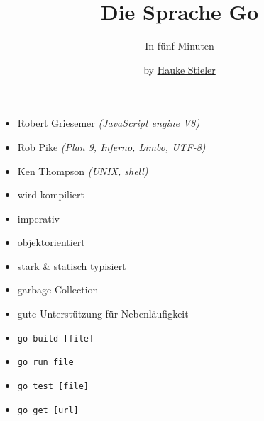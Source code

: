 \documentclass{beamer}
\title{Die Sprache Go}
\subtitle{In fünf Minuten}
\author{by \href{http://hauke-stieler.de/}{Hauke Stieler}}
\begin{document}
	\maketitle


	\begin{frame}
		\begin{itemize}
			\item Robert Griesemer {\scriptsize\textit{(JavaScript engine V8)}}
			\item Rob Pike {\scriptsize\textit{(Plan 9, Inferno, Limbo, UTF-8)}}
			\item Ken Thompson {\scriptsize\textit{(UNIX, shell)}}
		\end{itemize}
	\end{frame}


	\begin{frame}
		\begin{itemize}
			\item wird kompiliert
			\item imperativ
			\item objektorientiert
			\item stark \& statisch typisiert
			\item garbage Collection
			\item gute Unterstützung für Nebenläufigkeit
		\end{itemize}
	\end{frame}


	\begin{frame}
		\begin{itemize}
			\item \texttt{go build [file]}
			\item \texttt{go run file}
			\item \texttt{go test [file]}
			\item \texttt{go get [url]}
		\end{itemize}
	\end{frame}


	\begin{frame}[fragile]
		\inputminted{go}{code/01_hello.go}
\end{frame}
	
\end{document}
